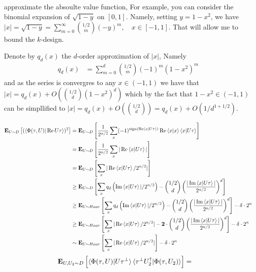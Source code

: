 \documentclass[manuscript,screen,review]{acmart}
\begin{document}
approximate the absoulte value function, For example, you can consider the binomial expansion of $\sqrt{1-y}$ on $[0,1]$. Namely, setting $y=1-x^2$, we have $|x|=\sqrt{1-y}=\sum_{m=0}^{\infty}\binom{1/2}{m}(-y)^m, \quad x\in[-1,1]$. That will allow me to bound the $k$-design. 

Denote by $q_{d}(x)$ the $d$-order approximation of $|x|$, Namely 
\begin{equation*}
  \begin{split}
q_{d}(x) &= \sum_{m=0}^{d}\binom{1/2}{m}(-1)^m\left( 1 - x^{2} \right)^{m}
  \end{split}
\end{equation*}
and as the series is convergres to any $x \in (-1,1)$ we have that $|x| = q_{d}(x) + O( \binom{1/2}{d}(1-x^{2})^d )$ which by the fact that $1- x^{2} \in (-1,1)$ can be simpllified to $|x| = q_{d}(x) + O( \binom{1/2}{d}) = q_{d}(x) + O( 1/d^{1 +1/2})$.
 
\begin{equation*}
  \begin{split}
  \exppm{ ( \braket{\Phi(\tau,U)|\Rea U\tau} )^{2}  }{ U \sim D } & =  \exppm{  \frac{1}{2^{n/2}}\sum_{x}(-1)^{\sign(\Rea \braket{x|U\tau})}\Rea \braket{x|x}\braket{x|U\tau}  }{ U \sim D } \\
& = \exppm{ \frac{1}{2^{n/2}}\sum_{x}|\Rea \braket{x|U\tau}|  }{ U \sim D } \\
& = \exppm{ \sum_{x}|\Rea \braket{x|U\tau} / 2^{n/2}|  }{ U \sim D } \\
& \ge \exppm{  \sum_{x} q_{d}\left( \Ima \braket{x|U\tau}| / 2^{n/2}  \right) - \binom{1/2}{d} \left(\frac{ | \Ima \braket{x|U\tau}| }{2^{n/2}}\right)^{d}}{ U \sim D } \\
& \ge \exppm{  \sum_{x} q_{d}\left( \Ima \braket{x|U\tau}| / 2^{n/2}  \right) - \binom{1/2}{d} \left(\frac{ | \Ima \braket{x|U\tau}| }{2^{n/2}}\right)^{d}}{ U \sim Haar } - \delta \cdot 2 ^{n} \\
& \ge \exppm{  \sum_{x} |\Rea \braket{x|U\tau} / 2^{n/2}|  - \mathbf{2} \cdot  \binom{1/2}{d} \left(\frac{ | \Ima \braket{x|U\tau}| }{2^{n/2}}\right)^{d}}{ U \sim Haar } - \delta \cdot 2 ^{n} \\
& \sim \exppm{  \sum_{x} |\Rea \braket{x|U\tau} / 2^{n/2}|}{ U \sim Haar } - \delta \cdot 2 ^{n} 
  \end{split}
\end{equation*}
\begin{equation*}
  \begin{split}
    \exppm{  \braket{\Phi(\tau,U)|U \tau^{\perp}}\braket{\tau^{\perp}U_{2}^{\dagger}|\Phi(\tau,U_{2})}  }{ U,U_{2} \sim D } & = 
  \end{split}
\end{equation*}
\end{document}
